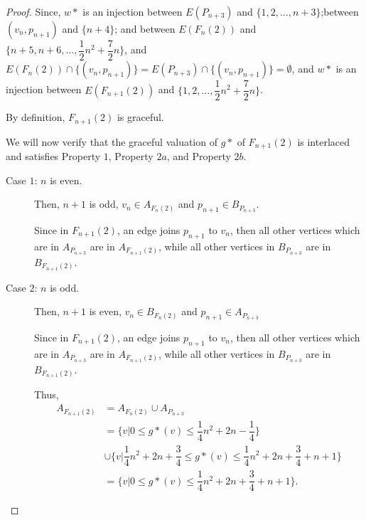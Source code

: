 \documentclass[12pt]{report}
\theoremstyle{definition}
\def\indent{\hspace*{.5cm}}
\begin{document}
\begin{proof}
	\indent Since, $w\ast$ is an injection between $E(P_{n+3})$ and $\big\{1,2,\ldots,n+3\big\}$;between $(v_{n},p_{n+1})$ and $\big\{n+4\big\}$; and between $E(F_{n}(2))$ and $\bigg\{n+5,n+6,\ldots,\dfrac{1}{2}n^2+\dfrac{7}{2}n\bigg\}$, and $E(F_{n}(2))\cap\Big\{(v_{n},p_{n+1})\Big\}=E(P_{n+3})\cap\Big\{(v_{n},p_{n+1})\Big\}=\emptyset$, and $w\ast$ is an injection between $E(F_{n+1}(2))$ and $\bigg\{1,2,\ldots,\dfrac{1}{2}n^2+\dfrac{7}{2}n\bigg\}$.
	
	\indent By definition, $F_{n+1}(2)$ is graceful.
	
	\indent We will now verify that the graceful valuation of $g\ast$ of $F_{n+1}(2)$ is interlaced and satisfies Property $1$, Property $2a$, and Property $2b$.
	
	\begin{description}
	    \item[Case $1$: $n$ is even.]
	    
	    Then, $n+1$ is odd, $v_{n}\in A_{F_{n}(2)}$ and $p_{n+1}\in B_{P_{n+3}}$.
	    
	    \indent Since in $F_{n+1}(2)$, an edge joins $p_{n+1}$ to $v_{n}$, then all other vertices which are in $A_{P_{n+3}}$ are in $A_{F_{n+1}(2)}$, while all other vertices in $B_{P_{n+3}}$ are in $B_{F_{n+1}(2)}$.
	    
	    \item[Case $2$: $n$ is odd.]
	    
	    Then, $n+1$ is even, $v_{n}\in B_{F_{n}(2)}$ and $p_{n+1}\in A_{P_{n+3}}$
	    
	    \indent Since in $F_{n+1}(2)$, an edge joins $p_{n+1}$ to $v_{n}$, then all other vertices which are in $A_{P_{n+3}}$ are in $A_{F_{n+1}(2)}$, while all other vertices in $B_{P_{n+3}}$ are in $B_{F_{n+1}(2)}$.
	    
	    \indent Thus,
	    \begin{equation*}
	        \begin{split}
	            A_{F_{n+1}(2)} &= A_{F_{n}(2)}\cup A_{P_{n+3}}\\
	            &=\bigg\{v|0\leq g\ast(v)\leq\dfrac{1}{4}n^2+2n-\dfrac{1}{4}\bigg\}\\
	            &\cup\bigg\{v|\dfrac{1}{4}n^2+2n+\dfrac{3}{4}\leq g\ast(v)\leq\dfrac{1}{4}n^2+2n+\dfrac{3}{4}+n+1\bigg\}\\
	            &=\bigg\{v|0\leq g\ast(v)\leq\dfrac{1}{4}n^2+2n+\dfrac{3}{4}+n+1\bigg\}.
	        \end{split}
	    \end{equation*}
	\end{description}


\end{proof}
\end{document}
